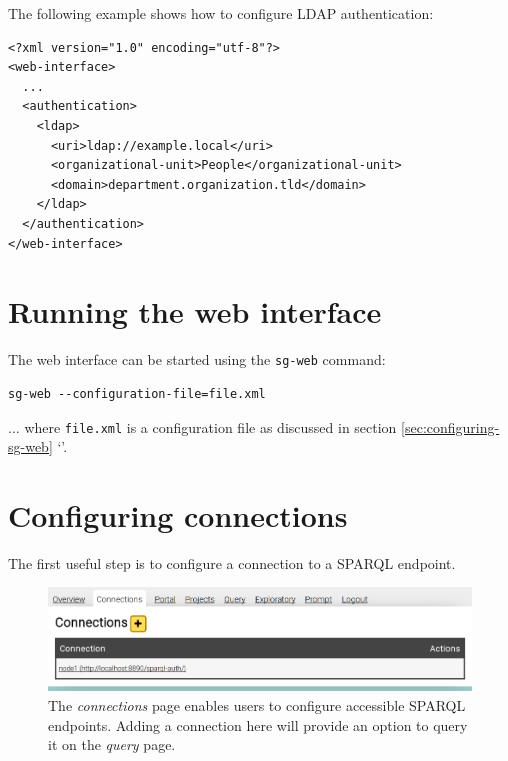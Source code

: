   The following example shows how to configure LDAP authentication:

\begin{siderules}
\begin{verbatim}
<?xml version="1.0" encoding="utf-8"?>
<web-interface>
  ...
  <authentication>
    <ldap>
      <uri>ldap://example.local</uri>
      <organizational-unit>People</organizational-unit>
      <domain>department.organization.tld</domain>
    </ldap>
  </authentication>
</web-interface>
\end{verbatim}
\end{siderules}

\section{Running the web interface}

  The web interface can be started using the \texttt{sg-web} command:

\begin{siderules}
\begin{verbatim}
sg-web --configuration-file=file.xml
\end{verbatim}
\end{siderules}

  $\ldots{}$ where \texttt{file.xml} is a configuration file as
  discussed in section \ref{sec:configuring-sg-web}
  {\color{LinkGray}`'}.

\section{Configuring connections}
\label{sec:configure-connections}

  The first useful step is to configure a connection to a SPARQL endpoint.

  \begin{figure}[h]
    \begin{center}
      \includegraphics[width=1.0\textwidth]{figures/web-connections.png}
    \end{center}
    \caption{The \emph{connections} page enables users to configure accessible
      SPARQL endpoints.  Adding a connection here will provide an option to
      query it on the \emph{query} page.}
    \label{fig:web-connections}
  \end{figure}

